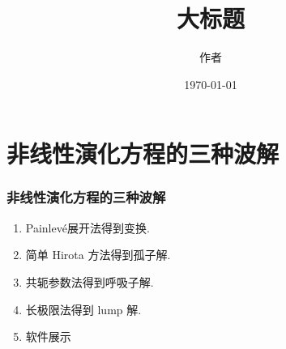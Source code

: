 \documentclass{beamer}
\title[页脚中部]{大标题}
\author[页脚左侧]{作者}
\date{\today}
\newcommand{\Painleve}{Painlev{\'e}}
\begin{document}

\section{非线性演化方程的三种波解}
\begin{frame}
\frametitle{非线性演化方程的三种波解}
\begin{enumerate}
\item \Painleve{}展开法得到变换.
\item 简单 Hirota 方法得到孤子解.
\item 共轭参数法得到呼吸子解.
\item 长极限法得到 lump 解.
\item 软件展示 
\end{enumerate}
\end{frame}
\end{document}
